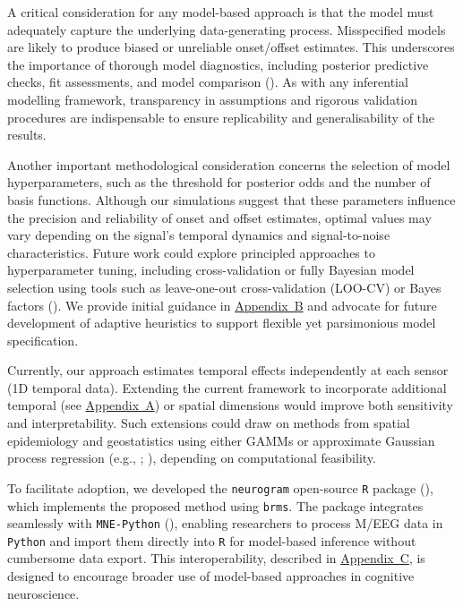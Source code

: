 \documentclass[
  doc,
  floatsintext,
  longtable,
  a4paper,
  nolmodern,
  notxfonts,
  notimes,
  colorlinks=true,linkcolor=blue,citecolor=blue,urlcolor=blue]{apa7}
\begin{document}
A critical consideration for any model-based approach is that the model
must adequately capture the underlying data-generating process.
Misspecified models are likely to produce biased or unreliable
onset/offset estimates. This underscores the importance of thorough
model diagnostics, including posterior predictive checks, fit
assessments, and model comparison (). As with any inferential modelling framework, transparency
in assumptions and rigorous validation procedures are indispensable to
ensure replicability and generalisability of the results.

Another important methodological consideration concerns the selection of
model hyperparameters, such as the threshold for posterior odds and the
number of basis functions. Although our simulations suggest that these
parameters influence the precision and reliability of onset and offset
estimates, optimal values may vary depending on the signal's temporal
dynamics and signal-to-noise characteristics. Future work could explore
principled approaches to hyperparameter tuning, including
cross-validation or fully Bayesian model selection using tools such as
leave-one-out cross-validation (LOO-CV) or Bayes factors
(). We provide initial
guidance in \hyperref[apx-basis]{Appendix~B} and advocate for future
development of adaptive heuristics to support flexible yet parsimonious
model specification.

Currently, our approach estimates temporal effects independently at each
sensor (1D temporal data). Extending the current framework to
incorporate additional temporal (see \hyperref[apx-2D]{Appendix~A}) or
spatial dimensions would improve both sensitivity and interpretability.
Such extensions could draw on methods from spatial epidemiology and
geostatistics using either GAMMs or approximate Gaussian process
regression (e.g., ; ), depending on computational feasibility.

To facilitate adoption, we developed the \texttt{neurogram} open-source
\texttt{R} package (), which
implements the proposed method using \texttt{brms}. The package
integrates seamlessly with \texttt{MNE-Python}
(), enabling researchers to
process M/EEG data in \texttt{Python} and import them directly into
\texttt{R} for model-based inference without cumbersome data export.
This interoperability, described in \hyperref[apx-package]{Appendix~C},
is designed to encourage broader use of model-based approaches in
cognitive neuroscience.
\end{document}
